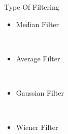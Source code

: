 \documentclass{beamer}
\begin{document}
\begin{frame}{Type Of Filtering}

\begin{itemize}
	\item Median Filter
	
	
	
	\
	
	\item  Average Filter
	
	
	\
	
		\item Gaussian Filter
		
	
	
	\
	
	\item  Wiener Filter
	
\end{itemize}

\end{frame}
\end{document}
